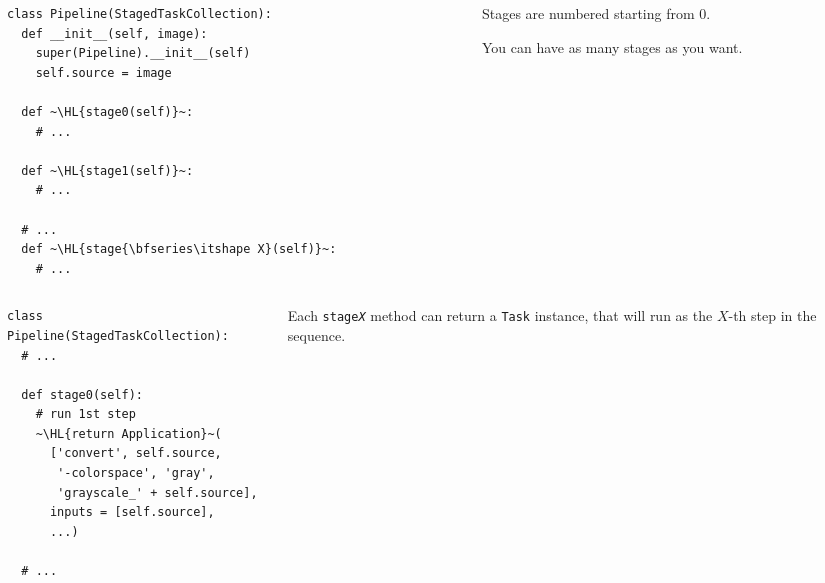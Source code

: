 \documentclass[english,serif,mathserif,xcolor=pdftex,dvipsnames,table]{beamer}
\begin{document}
\begin{frame}[fragile]
  \begin{columns}[c]
    \begin{column}{0.6\textwidth}
      \begin{lstlisting}[basicstyle=\footnotesize\ttfamily]
class Pipeline(StagedTaskCollection):
  def __init__(self, image):
    super(Pipeline).__init__(self)
    self.source = image

  def ~\HL{stage0(self)}~:
    # ...

  def ~\HL{stage1(self)}~:
    # ...

  # ...
  def ~\HL{stage{\bfseries\itshape X}(self)}~:
    # ...
      \end{lstlisting}
    \end{column}
    \begin{column}{0.4\textwidth}
      \raggedleft

      Stages are numbered starting from $0$.

      \+
      You can have as many stages as you want.
    \end{column}
  \end{columns}
\end{frame}


\begin{frame}[fragile]
  \begin{columns}[c]
    \begin{column}{0.6\textwidth}
      \begin{lstlisting}[basicstyle=\footnotesize\ttfamily]
class Pipeline(StagedTaskCollection):
  # ...

  def stage0(self):
    # run 1st step
    ~\HL{return Application}~(
      ['convert', self.source,
       '-colorspace', 'gray',
       'grayscale_' + self.source],
      inputs = [self.source],
      ...)

  # ...
      \end{lstlisting}
    \end{column}
    \begin{column}{0.4\textwidth}
      \raggedleft

      Each \texttt{stage{\itshape X}} method can return a \texttt{Task}
      instance, that will run as the $X$-th step in the sequence.
    \end{column}
  \end{columns}
\end{frame}
\end{document}
